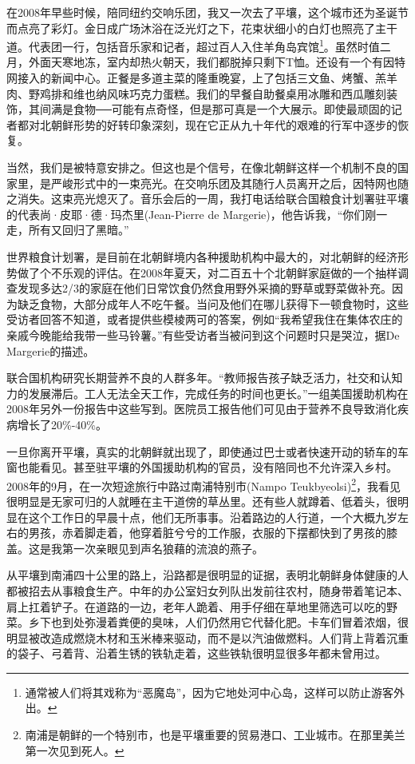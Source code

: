 在2008年早些时候，陪同纽约交响乐团，我又一次去了平壤，这个城市还为圣诞节而点亮了彩灯。金日成广场沐浴在泛光灯之下，花束状细小的白灯也照亮了主干道。代表团一行，包括音乐家和记者，超过百人入住羊角岛宾馆\footnote{通常被人们将其戏称为“恶魔岛”，因为它地处河中心岛，这样可以防止游客外出。}。虽然时值二月，外面天寒地冻，室内却热火朝天，我们都脱掉只剩下T恤。还设有一个有因特网接入的新闻中心。正餐是多道主菜的隆重晚宴，上了包括三文鱼、烤蟹、羔羊肉、野鸡排和维也纳风味巧克力蛋糕。我们的早餐自助餐桌用冰雕和西瓜雕刻装饰，其间满是食物──可能有点奇怪，但是那可真是一个大展示。即使最顽固的记者都对北朝鲜形势的好转印象深刻，现在它正从九十年代的艰难的行军中逐步的恢复。

当然，我们是被特意安排之。但这也是个信号，在像北朝鲜这样一个机制不良的国家里，是严峻形式中的一束亮光。在交响乐团及其随行人员离开之后，因特网也随之消失。这束亮光熄灭了。音乐会后的一周，我打电话给联合国粮食计划署驻平壤的代表尚·皮耶·德·玛杰里(Jean-Pierre de Margerie)，他告诉我，“你们刚一走，所有又回归了黑暗。”

世界粮食计划署，是目前在北朝鲜境内各种援助机构中最大的，对北朝鲜的经济形势做了个不乐观的评估。在2008年夏天，对二百五十个北朝鲜家庭做的一个抽样调查发现多达2/3的家庭在他们日常饮食仍然食用野外采摘的野草或野菜做补充。因为缺乏食物，大部分成年人不吃午餐。当问及他们在哪儿获得下一顿食物时，这些受访者回答不知道，或者提供些模棱两可的答案，例如“我希望我住在集体农庄的亲戚今晚能给我带一些马铃薯。”有些受访者当被问到这个问题时只是哭泣，据De Margerie的描述。

联合国机构研究长期营养不良的人群多年。“教师报告孩子缺乏活力，社交和认知力的发展滞后。工人无法全天工作，完成任务的时间也更长。”一组美国援助机构在2008年另外一份报告中这些写到。医院员工报告他们可见由于营养不良导致消化疾病增长了20\%-40\%。

一旦你离开平壤，真实的北朝鲜就出现了，即使通过巴士或者快速开动的轿车的车窗也能看见。甚至驻平壤的外国援助机构的官员，没有陪同也不允许深入乡村。2008年的9月，在一次短途旅行中路过南浦特别市(Nampo Teukbyeolsi)\footnote{南浦是朝鲜的一个特别市，也是平壤重要的贸易港口、工业城市。在那里美兰第一次见到死人。}，我看见很明显是无家可归的人就睡在主干道傍的草丛里。还有些人就蹲着、低着头，很明显在这个工作日的早晨十点，他们无所事事。沿着路边的人行道，一个大概九岁左右的男孩，赤着脚走着，他穿着脏兮兮的工作服，衣服的下摆都快到了男孩的膝盖。这是我第一次亲眼见到声名狼藉的流浪的燕子。

从平壤到南浦四十公里的路上，沿路都是很明显的证据，表明北朝鲜身体健康的人都被招去从事粮食生产。中年的办公室妇女列队出发前往农村，随身带着笔记本、肩上扛着铲子。在道路的一边，老年人跪着、用手仔细在草地里筛选可以吃的野菜。乡下也到处弥漫着粪便的臭味，人们仍然用它代替化肥。卡车们冒着浓烟，很明显被改造成燃烧木材和玉米棒来驱动，而不是以汽油做燃料。人们背上背着沉重的袋子、弓着背、沿着生锈的铁轨走着，这些铁轨很明显很多年都未曾用过。


